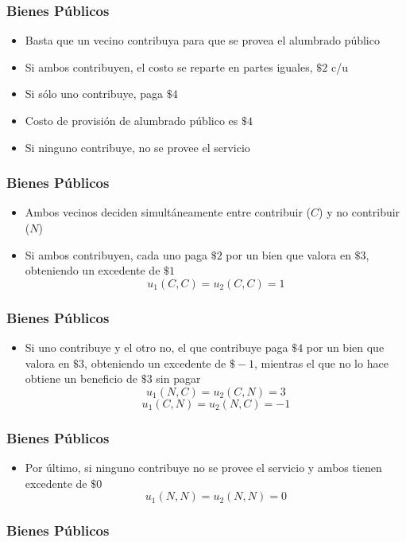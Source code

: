 \documentclass[dvipsnames,table,leqno]{beamer}
\newcommand{\peq}[1]{{\scriptscriptstyle{#1}}}
\newcommand{\rp}[1]{\left(#1\right)}
\begin{document}
		\begin{frame}
			\frametitle{Bienes Públicos}
			\begin{itemize}
				\item Basta que un vecino contribuya para que se provea el alumbrado público
				\item Si ambos contribuyen, el costo se reparte en partes iguales, $\$2$ c/u
				\item Si sólo uno contribuye, paga $\$4$
				\item Costo de provisión de alumbrado público es $\$4$
				\item Si ninguno contribuye, no se provee el servicio
			\end{itemize}
		\end{frame}	

		\begin{frame}
			\frametitle{Bienes Públicos}
			\begin{itemize}
				\item Ambos vecinos deciden simultáneamente entre contribuir ($C$) y no contribuir ($N$) 
				\item Si ambos contribuyen, cada uno paga $\$2$ por un bien que valora en $\$3$, obteniendo un excedente de $\$1$ $$u_\peq{1}\rp{C,C}=u_\peq{2}\rp{C,C}=1$$
			\end{itemize}
		\end{frame}	

		\begin{frame}
			\frametitle{Bienes Públicos}
			\begin{itemize}
				\item Si uno contribuye y el otro no, el que contribuye paga $\$4$ por un bien que valora en $\$3$, obteniendo un excedente de $\$-1$, mientras el que no lo hace obtiene un beneficio de $\$3$ sin pagar $$u_\peq{1}\rp{N,C}=u_\peq{2}\rp{C,N}=3$$ $$u_\peq{1}\rp{C,N}=u_\peq{2}\rp{N,C}=-1$$ 
			\end{itemize}
		\end{frame}	

		\begin{frame}
			\frametitle{Bienes Públicos}
			\begin{itemize}
				\item Por último, si ninguno contribuye no se provee el servicio y ambos tienen excedente de $\$0$ $$u_\peq{1}\rp{N,N}=u_\peq{2}\rp{N,N}=0$$ 
			\end{itemize}
		\end{frame}	

		\begin{frame}
			\frametitle{Bienes Públicos}
			\begin{table}[htbp!]
				\centering
				\resizebox{9cm}{!}{
					\begin{tabular}{|l|c|c|}\hline
						$J_\peq{1}$/$J_\peq{2}$&$N$&$C$ \\ [1ex] \hline
						$N$						 &$\rp{0,0}$&$\rp{3,-1}$ \\ [1ex] \hline 
						$C$						 &$\rp{-1,3}$&$\rp{1,1}$ \\ [1ex] \hline 
					\end{tabular}}
			\end{table}
		\end{frame}	
\end{document}
